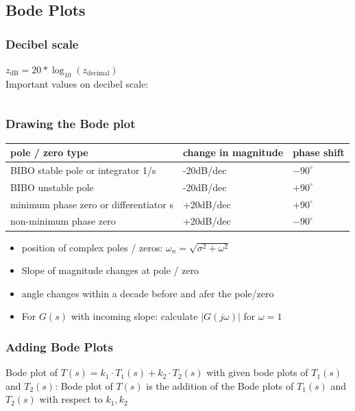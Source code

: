 \subsection{Bode Plots}
    \subsubsection{Decibel scale}
        $z_{\text{dB}} = 20 * \log_{10}(z_{\text{decimal}})$\\
        Important values on decibel scale:
        \begin{tabu}{X X}
            
        \end{tabu}
    
    \subsubsection{Drawing the Bode plot}
        \begin{tabu}{| X | X | X |}
            \hline
            pole / zero type & change in magnitude & phase shift\\
            \hline \hline
            BIBO stable pole or integrator 1/s & -20dB/dec & $-90^{\circ}$\\
            \hline
            BIBO unstable pole & -20dB/dec & $+90^{\circ}$\\
            \hline
            minimum phase zero or differentiator s & +20dB/dec & $+90^{\circ}$\\
            \hline
            non-minimum phase zero & +20dB/dec & $-90^{\circ}$\\
            \hline
        \end{tabu}
        \begin{itemize}
            \item position of complex poles / zeros: $\omega_n = \sqrt{\sigma^2 + \omega^2}$
            \item Slope of magnitude changes at pole / zero
            \item angle changes within a decade before and afer the pole/zero
            \item For $G(s)$ with incoming slope: calculate $|G(j \omega)|$ for $\omega = 1$
        \end{itemize}

    \subsubsection{Adding Bode Plots}
        Bode plot of $T(s) = k_1 \cdot T_1(s) + k_2 \cdot T_2(s)$ with given bode plots of $T_1(s)$ and $T_2(s)$:
        Bode plot of $T(s)$ is the addition of the Bode plots of $T_1(s)$ and $T_2(s)$ with respect to $k_1, k_2$

